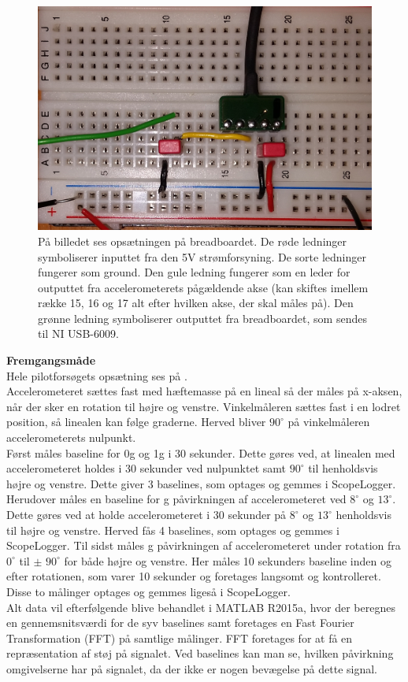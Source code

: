\begin{figure}[H]
	\centering
	\includegraphics[scale=0.15]{figures/cProblemloesning/PF2.jpg}
	\caption{På billedet ses opsætningen på breadboardet. De røde ledninger symboliserer inputtet fra den 5V strømforsyning. De sorte ledninger fungerer som ground. Den gule ledning fungerer som en leder for outputtet fra accelerometerets pågældende akse (kan skiftes imellem række 15, 16 og 17 alt efter hvilken akse, der skal måles på). Den grønne ledning symboliserer outputtet fra breadboardet, som sendes til NI USB-6009.}
	\label{pforsoeg1}
\end{figure}

\noindent\textbf{Fremgangsmåde}\\
Hele pilotforsøgets opsætning ses på . \\
Accelerometeret sættes fast med hæftemasse på en lineal så der måles på x-aksen, når der sker en rotation til højre og venstre. Vinkelmåleren sættes fast i en lodret position, så linealen kan følge graderne. Herved bliver $90^{\circ}$ på vinkelmåleren accelerometerets nulpunkt. \\
Først måles baseline for 0g og 1g i 30 sekunder. Dette gøres ved, at linealen med accelerometeret holdes i 30 sekunder ved nulpunktet samt $90^{\circ}$ til henholdsvis højre og venstre. Dette giver 3 baselines, som optages og gemmes i ScopeLogger. Herudover måles en baseline for g påvirkningen af accelerometeret ved $8^{\circ}$ og $13^{\circ}$. Dette gøres ved at holde accelerometeret i 30 sekunder på $8^{\circ}$ og $13^{\circ}$ henholdsvis til højre og venstre. Herved fås 4 baselines, som optages og gemmes i ScopeLogger.
Til sidst måles g påvirkningen af accelerometeret under rotation fra $0^{\circ}$ til $\pm$ $90^{\circ}$ for både højre og venstre. Her måles 10 sekunders baseline inden og efter rotationen, som varer 10 sekunder og foretages langsomt og kontrolleret. Disse to målinger optages og gemmes ligeså i ScopeLogger. \\
Alt data vil efterfølgende blive behandlet i MATLAB R2015a, hvor der beregnes en gennemsnitsværdi for de syv baselines samt foretages en Fast Fourier Transformation (FFT) på samtlige målinger. FFT foretages for at få en repræsentation af støj på signalet. Ved baselines kan man se, hvilken påvirkning omgivelserne har på signalet, da der ikke er nogen bevægelse på dette signal.

